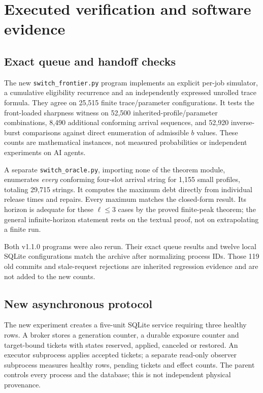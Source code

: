 \section{Executed verification and software evidence}
\label{sec:eval}
\subsection{Exact queue and handoff checks}
The new \texttt{switch\_frontier.py} program implements an explicit per-job simulator, a cumulative eligibility recurrence and an independently expressed unrolled trace formula. They agree on 25,515 finite trace/parameter configurations. It tests the front-loaded sharpness witness on 52,500 inherited-profile/parameter combinations, 8,490 additional conforming arrival sequences, and 52,920 inverse-burst comparisons against direct enumeration of admissible $b$ values. These counts are mathematical instances, not measured probabilities or independent experiments on AI agents.

A separate \texttt{switch\_oracle.py}, importing none of the theorem module, enumerates \emph{every} conforming four-slot arrival string for 1,155 small profiles, totaling 29,715 strings. It computes the maximum debt directly from individual release times and repairs. Every maximum matches the closed-form result. Its horizon is adequate for these $\ell\le3$ cases by the proved finite-peak theorem; the general infinite-horizon statement rests on the textual proof, not on extrapolating a finite run.

Both v1.1.0 programs were also rerun. Their exact queue results and twelve local SQLite configurations match the archive after normalizing process IDs. Those 119 old commits and stale-request rejections are inherited regression evidence and are not added to the new counts.

\subsection{New asynchronous protocol}
The new experiment creates a five-unit SQLite service requiring three healthy rows. A broker stores a generation counter, a durable exposure counter and target-bound tickets with states reserved, applied, canceled or restored. An executor subprocess applies accepted tickets; a separate read-only observer subprocess measures healthy rows, pending tickets and effect counts. The parent controls every process and the database; this is not independent physical provenance.

